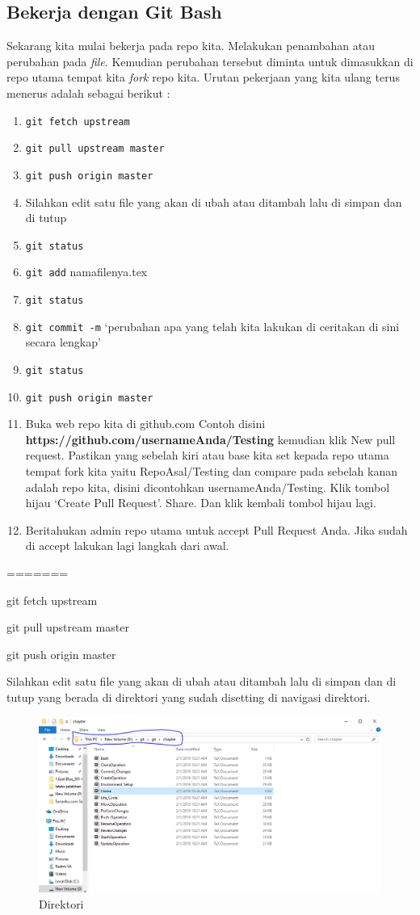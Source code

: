 \subsection{Bekerja dengan Git Bash}
Sekarang kita mulai bekerja pada repo kita. Melakukan penambahan atau perubahan pada \textit{file}. Kemudian perubahan tersebut diminta untuk dimasukkan di repo utama tempat kita \textit{fork} repo kita. Urutan pekerjaan yang kita ulang terus menerus adalah sebagai berikut :
\begin{enumerate}
\item \verb|git fetch upstream|
\item \verb|git pull upstream master|
\item \verb|git push origin master|
\item Silahkan edit satu file yang akan di ubah atau ditambah lalu di simpan dan di tutup
\item \verb|git status|
\item \verb|git add| namafilenya.tex
\item \verb|git status|
\item \verb|git commit -m| `perubahan apa yang telah kita lakukan di ceritakan di sini secara lengkap'
\item \verb|git status|
\item \verb|git push origin master|
\item Buka web repo kita di github.com
Contoh disini \textbf{https://github.com/usernameAnda/Testing} kemudian klik New pull request. Pastikan yang sebelah kiri atau base kita set kepada repo utama tempat fork kita yaitu RepoAsal/Testing dan compare pada sebelah kanan adalah repo kita, disini dicontohkan usernameAnda/Testing. Klik tombol hijau `Create Pull Request'. Share. Dan klik kembali tombol hijau lagi.
\item Beritahukan admin repo utama untuk accept Pull Request Anda. Jika sudah di accept lakukan lagi langkah dari awal.
\end{enumerate}
=======
\item git fetch upstream
\item git pull upstream master
\item git push origin master
\item Silahkan edit satu file yang akan di ubah atau ditambah lalu di simpan dan di tutup yang berada di direktori yang sudah disetting di navigasi direktori.
    \begin{figure}[!htbp]
        \centering
            \includegraphics[width=.75\textwidth]{Figures/Capture}
            \caption{Direktori}
        \label{penanda}
    \end{figure}
